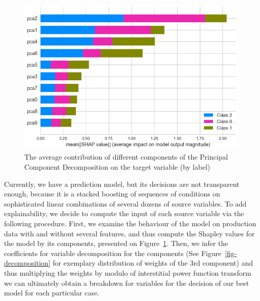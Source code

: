 \documentclass[
  letterpaper,
  DIV=11,
  numbers=noendperiod]{scrartcl}
\begin{document}
\begin{figure}

{\centering \includegraphics{report_AzadhdhinNedalYunisAlFraijat_files/figure-pdf/fig-explanation-output-1.png}

}

\caption{\label{fig-explanation}The average contribution of different
components of the Principal Component Decomposition on the target
variable (by label)}

\end{figure}

Currently, we have a prediction model, but its decisions are not
transparent enough, because it is a stacked boosting of sequences of
conditions on sophisticated linear combinations of several dozens of
source variables. To add explainability, we decide to compute the input
of each source variable via the following procedure. First, we examine
the behaviour of the model on production data with and without several
features, and thus compute the Shapley values for the model by its
components, presented on Figure~\ref{fig-explanation}. Then, we infer
the coefficients for variable decomposition for the components (See
Figure~\ref{fig-decomposition} for exemplary distribution of weights of
the 3rd component) and thus multiplying the weights by modulo of
interstitial power function transform we can ultimately obtain a
breakdown for variables for the decision of our best model for each
particular case.
\end{document}
